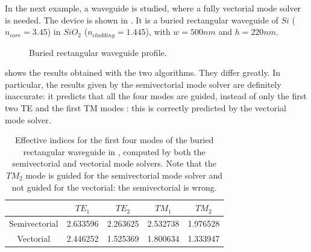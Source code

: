 In the next example, a waveguide is studied, where a fully vectorial
mode solver is needed. The device is shown in . It
is a buried rectangular waveguide of $Si$ ($n_{core} = 3.45$) in
$SiO_2$ ($n_{cladding} = 1.445$), with $w = 500 nm$ and $h = 220 nm$.

\begin{figure}[htbp]
  \begin{center}
    \resizebox{4cm}{!}{}
  \end{center}
  \caption{Buried rectangular waveguide profile.}
  \label{fig:plabs}
\end{figure}

 shows the results obtained with the two
algorithms. They differ greatly. In particular, the results given by
the semivectorial mode solver are definitely inaccurate: it predicts
that all the four modes are guided, instead of only the first two TE and
the first TM modes \cite{plabs}: this is correctly predicted by the
vectorial mode solver.

\begin{table}[htbp]
  \begin{center}
    \begin{tabular}{*{5}{c}}
      \hline
      & $TE_1$ & $TE_2$ & $TM_1$ & $TM_2$ \\
      \hline
      Semivectorial & 2.633596 & 2.263625 & 2.532738 & 1.976528 \\
      Vectorial & 2.446252 & 1.525369 & 1.800634 & 1.333947 \\
      \hline
    \end{tabular}
  \end{center}
  \caption{Effective indices for the first four modes of the buried
    rectangular waveguide in , computed by both the
    semivectorial and vectorial mode solvers. Note that the $TM_2$ mode
    is guided for the semivectorial mode solver and not guided for the
    vectorial: the semivectorial is wrong.}
  \label{tab:plabs}
\end{table}

